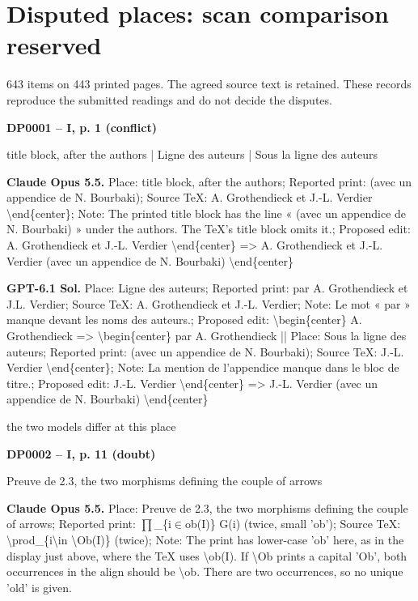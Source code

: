 \chapter*{Disputed places: scan comparison reserved}
643 items on 443 printed pages. The agreed source text is retained. These records reproduce the submitted readings and do not decide the disputes.
\begingroup\small\raggedright\sloppy\setlength{\parskip}{4pt}
\par\noindent\hypertarget{DP0001}{}\textbf{DP0001 -- I, p. 1 (conflict)}\par
title block, after the authors | Ligne des auteurs | Sous la ligne des auteurs\par
\textbf{Claude Opus 5.5.} Place: title block, after the authors; Reported print: (avec un appendice de N. Bourbaki); Source TeX: A. Grothendieck et J.-L. Verdier \textbackslash{}end\{center\}; Note: The printed title block has the line « (avec un appendice de N. Bourbaki) » under the authors. The TeX's title block omits it.; Proposed edit: A. Grothendieck et J.-L. Verdier \textbackslash{}end\{center\} =\allowbreak > A. Grothendieck et J.-L. Verdier  (avec un appendice de N. Bourbaki) \textbackslash{}end\{center\}\par
\textbf{GPT-6.1 Sol.} Place: Ligne des auteurs; Reported print: par A. Grothendieck et J.L. Verdier; Source TeX: A. Grothendieck et J.-L. Verdier; Note: Le mot « par » manque devant les noms des auteurs.; Proposed edit: \textbackslash{}begin\{center\} A. Grothendieck =\allowbreak > \textbackslash{}begin\{center\} par A. Grothendieck || Place: Sous la ligne des auteurs; Reported print: (avec un appendice de N. Bourbaki); Source TeX: J.-L. Verdier \textbackslash{}end\{center\}; Note: La mention de l'appendice manque dans le bloc de titre.; Proposed edit: J.-L. Verdier \textbackslash{}end\{center\} =\allowbreak > J.-L. Verdier  (avec un appendice de N. Bourbaki) \textbackslash{}end\{center\}\par
the two models differ at this place\par
\par\noindent\hypertarget{DP0002}{}\textbf{DP0002 -- I, p. 11 (doubt)}\par
Preuve de 2.3, the two morphisms defining the couple of arrows\par
\textbf{Claude Opus 5.5.} Place: Preuve de 2.3, the two morphisms defining the couple of arrows; Reported print: \ensuremath{\prod}\_\{i\ensuremath{\in}ob(I)\} G(i) (twice, small 'ob'); Source TeX: \textbackslash{}prod\_\{i\textbackslash{}in \textbackslash{}Ob(I)\} (twice); Note: The print has lower-case 'ob' here, as in the display just above, where the TeX uses \textbackslash{}ob(I). If \textbackslash{}Ob prints a capital 'Ob', both occurrences in the align should be \textbackslash{}ob. There are two occurrences, so no unique 'old' is given.\par
